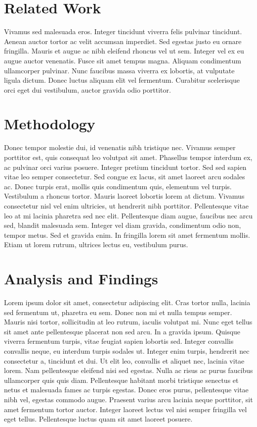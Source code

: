 \documentclass[11pt,conference]{IEEEtran}
\begin{document}
\section{Related Work} \label{related}

Vivamus sed malesuada eros. Integer tincidunt viverra felis pulvinar tincidunt. Aenean auctor tortor ac velit accumsan imperdiet. Sed egestas justo eu ornare fringilla. Mauris et augue ac nibh eleifend rhoncus vel ut sem. Integer vel ex eu augue auctor venenatis. Fusce sit amet tempus magna. Aliquam condimentum ullamcorper pulvinar. Nunc faucibus massa viverra ex lobortis, at vulputate ligula dictum. Donec luctus aliquam elit vel fermentum. Curabitur scelerisque orci eget dui vestibulum, auctor gravida odio porttitor. 

\section{Methodology} \label{methodology}

Donec tempor molestie dui, id venenatis nibh tristique nec. Vivamus semper porttitor est, quis consequat leo volutpat sit amet. Phasellus tempor interdum ex, ac pulvinar orci varius posuere. Integer pretium tincidunt tortor. Sed sed sapien vitae leo semper consectetur. Sed congue ex lacus, sit amet laoreet arcu sodales ac. Donec turpis erat, mollis quis condimentum quis, elementum vel turpis. Vestibulum a rhoncus tortor. Mauris laoreet lobortis lorem at dictum. Vivamus consectetur nisl vel enim ultricies, ut hendrerit nibh porttitor. Pellentesque vitae leo at mi lacinia pharetra sed nec elit. Pellentesque diam augue, faucibus nec arcu sed, blandit malesuada sem. Integer vel diam gravida, condimentum odio non, tempor metus. Sed et gravida enim. In fringilla lorem sit amet fermentum mollis. Etiam ut lorem rutrum, ultrices lectus eu, vestibulum purus. 

\section{Analysis and Findings} \label{analysis}

Lorem ipsum dolor sit amet, consectetur adipiscing elit. Cras tortor nulla, lacinia sed fermentum ut, pharetra eu sem. Donec non mi et nulla tempus semper. Mauris nisi tortor, sollicitudin at leo rutrum, iaculis volutpat mi. Nunc eget tellus sit amet ante pellentesque placerat non sed arcu. In a gravida ipsum. Quisque viverra fermentum turpis, vitae feugiat sapien lobortis sed. Integer convallis convallis neque, eu interdum turpis sodales ut. Integer enim turpis, hendrerit nec consectetur a, tincidunt et dui. Ut elit leo, convallis et aliquet nec, lacinia vitae lorem. Nam pellentesque eleifend nisi sed egestas. Nulla ac risus ac purus faucibus ullamcorper quis quis diam. Pellentesque habitant morbi tristique senectus et netus et malesuada fames ac turpis egestas. Donec eros purus, pellentesque vitae nibh vel, egestas commodo augue. Praesent varius arcu lacinia neque porttitor, sit amet fermentum tortor auctor. Integer laoreet lectus vel nisi semper fringilla vel eget tellus. Pellentesque luctus quam sit amet laoreet posuere. 
\end{document}
